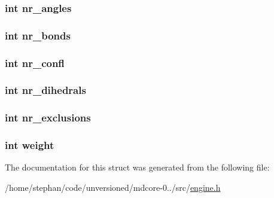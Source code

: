 \hypertarget{structengine__set_a03b0ba344cd1442d3d3975774eeea3e9}{
\subsubsection[{nr\-\_\-angles}]{\setlength{\rightskip}{0pt plus 5cm}int nr\-\_\-angles}}\label{structengine__set_a03b0ba344cd1442d3d3975774eeea3e9}
\hypertarget{structengine__set_ad29e940869fdac422337511d82a22ae6}{
\subsubsection[{nr\-\_\-bonds}]{\setlength{\rightskip}{0pt plus 5cm}int nr\-\_\-bonds}}\label{structengine__set_ad29e940869fdac422337511d82a22ae6}
\hypertarget{structengine__set_ae8551c4c5c4f78983b2bcd01d5d6f6f9}{
\subsubsection[{nr\-\_\-confl}]{\setlength{\rightskip}{0pt plus 5cm}int nr\-\_\-confl}}\label{structengine__set_ae8551c4c5c4f78983b2bcd01d5d6f6f9}
\hypertarget{structengine__set_a3ec4bdb694eae0871b24da3bc151294c}{
\subsubsection[{nr\-\_\-dihedrals}]{\setlength{\rightskip}{0pt plus 5cm}int nr\-\_\-dihedrals}}\label{structengine__set_a3ec4bdb694eae0871b24da3bc151294c}
\hypertarget{structengine__set_a56befbaa94d303065a80da7bec85acea}{
\subsubsection[{nr\-\_\-exclusions}]{\setlength{\rightskip}{0pt plus 5cm}int nr\-\_\-exclusions}}\label{structengine__set_a56befbaa94d303065a80da7bec85acea}
\hypertarget{structengine__set_aa01147b1f07072d246c76dc85d69df7c}{
\subsubsection[{weight}]{\setlength{\rightskip}{0pt plus 5cm}int weight}}\label{structengine__set_aa01147b1f07072d246c76dc85d69df7c}


The documentation for this struct was generated from the following file\-:\begin{DoxyCompactItemize}
\item 
/home/stephan/code/unversioned/mdcore-\/0../src/\hyperlink{engine_8h}{engine.\-h}\end{DoxyCompactItemize}
